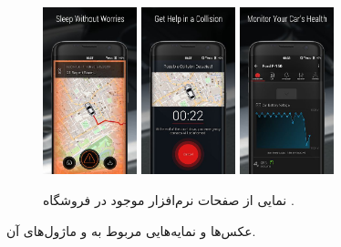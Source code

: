 \documentclass[a4paper,12pt]{report}
\begin{document}
\begin{figure}[!h]
		\begin{subfigure}[t]{0.8\linewidth}
			\centering
			\includegraphics[width=0.3\textwidth]{images/carlock-app-ui-1.jpeg}
			\includegraphics[width=0.3\textwidth]{images/carlock-app-ui-2.jpeg}
			\includegraphics[width=0.3\textwidth]{images/carlock-app-ui-3.jpeg}
			\caption{
				نمایی از صفحات نرم‌افزار
				موجود در فروشگاه
				.
			}
			\label{subfig2:fig2:subsec3:sec3:chap1}
		\end{subfigure}
		\normalsize
		\caption{
			عکس‌ها و نمایه‌هایی
			مربوط به
			و ماژول‌های آن.
		}
		\label{fig2:subsec3:sec3:chap1}
	\end{figure}
\end{document}
